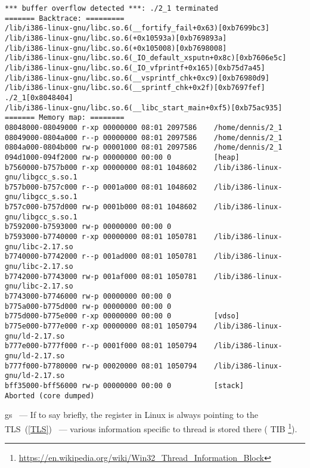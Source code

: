 \begin{lstlisting}
*** buffer overflow detected ***: ./2_1 terminated
======= Backtrace: =========
/lib/i386-linux-gnu/libc.so.6(__fortify_fail+0x63)[0xb7699bc3]
/lib/i386-linux-gnu/libc.so.6(+0x10593a)[0xb769893a]
/lib/i386-linux-gnu/libc.so.6(+0x105008)[0xb7698008]
/lib/i386-linux-gnu/libc.so.6(_IO_default_xsputn+0x8c)[0xb7606e5c]
/lib/i386-linux-gnu/libc.so.6(_IO_vfprintf+0x165)[0xb75d7a45]
/lib/i386-linux-gnu/libc.so.6(__vsprintf_chk+0xc9)[0xb76980d9]
/lib/i386-linux-gnu/libc.so.6(__sprintf_chk+0x2f)[0xb7697fef]
./2_1[0x8048404]
/lib/i386-linux-gnu/libc.so.6(__libc_start_main+0xf5)[0xb75ac935]
======= Memory map: ========
08048000-08049000 r-xp 00000000 08:01 2097586    /home/dennis/2_1
08049000-0804a000 r--p 00000000 08:01 2097586    /home/dennis/2_1
0804a000-0804b000 rw-p 00001000 08:01 2097586    /home/dennis/2_1
094d1000-094f2000 rw-p 00000000 00:00 0          [heap]
b7560000-b757b000 r-xp 00000000 08:01 1048602    /lib/i386-linux-gnu/libgcc_s.so.1
b757b000-b757c000 r--p 0001a000 08:01 1048602    /lib/i386-linux-gnu/libgcc_s.so.1
b757c000-b757d000 rw-p 0001b000 08:01 1048602    /lib/i386-linux-gnu/libgcc_s.so.1
b7592000-b7593000 rw-p 00000000 00:00 0
b7593000-b7740000 r-xp 00000000 08:01 1050781    /lib/i386-linux-gnu/libc-2.17.so
b7740000-b7742000 r--p 001ad000 08:01 1050781    /lib/i386-linux-gnu/libc-2.17.so
b7742000-b7743000 rw-p 001af000 08:01 1050781    /lib/i386-linux-gnu/libc-2.17.so
b7743000-b7746000 rw-p 00000000 00:00 0
b775a000-b775d000 rw-p 00000000 00:00 0
b775d000-b775e000 r-xp 00000000 00:00 0          [vdso]
b775e000-b777e000 r-xp 00000000 08:01 1050794    /lib/i386-linux-gnu/ld-2.17.so
b777e000-b777f000 r--p 0001f000 08:01 1050794    /lib/i386-linux-gnu/ld-2.17.so
b777f000-b7780000 rw-p 00020000 08:01 1050794    /lib/i386-linux-gnu/ld-2.17.so
bff35000-bff56000 rw-p 00000000 00:00 0          [stack]
Aborted (core dumped)
\end{lstlisting}

gs ~--- 
{If to say briefly, the  register in Linux is always pointing to the \ac{TLS}~(\ref{TLS}) ~--- various information specific
to thread is stored there}
(
\ac{TIB} \footnote{\url{https://en.wikipedia.org/wiki/Win32_Thread_Information_Block}}). 

